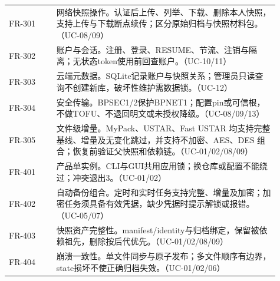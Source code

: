 \begin{longtable}{L{0.16\linewidth}L{0.75\linewidth}}
FR-301 & 网络快照操作。认证后上传、列举、下载、删除本人快照，支持上传与下载断点续传；区分原始归档与快照材料包。（UC-08/09）\\
FR-302 & 账户与会话。注册、登录、RESUME、节流、注销与隔离；无状态token使用前回查账户。（UC-10/11）\\
FR-303 & 云端元数据。SQLite记录账户与快照关系；管理员只读查询不创建新库，破坏性维护需数据锁。（UC-12）\\
FR-304 & 安全传输。BPSEC1/2保护BPNET1；配置pin或可信根，不做TOFU、不退回明文或未授权降级。（UC-08/09/13）\\
FR-305 & 文件级增量。MyPack、USTAR、Fast USTAR 均支持完整基线、增量及无变化跳过，并支持不加密、AES、DES 组合；恢复前验证父快照和依赖链。（UC-01/02/08/09）\\
FR-401 & 产品单实例。CLI与GUI共用应用锁；换仓库或配置不能绕过；冲突退出3。（UC-01/02）\\
FR-402 & 自动备份组合。定时和实时任务支持完整、增量及加密；加密任务须具备有效凭据，缺少凭据时提示解锁或报错。（UC-05/07）\\
FR-403 & 快照资产完整性。manifest/identity与归档绑定，保留被依赖祖先，删除按后代优先。（UC-01/02/08/09）\\
FR-404 & 崩溃一致性。单文件同步与原子发布；多文件顺序有边界，state损坏不使正确归档失效。（UC-01/02/06）\\
\bottomrule\end{longtable}
